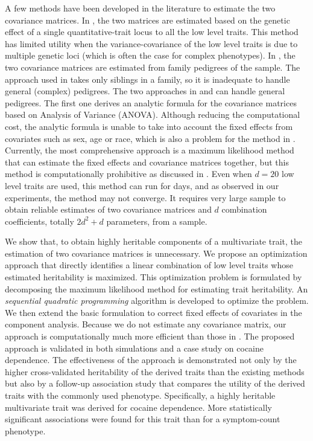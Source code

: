 \documentclass[10pt,letterpaper]{article}
\begin{document}
A few methods have been developed in the literature to estimate the two covariance matrices. In \cite{Wang:2007:pch-ridge,Klei:2008:pch}, the two matrices are estimated based on the genetic effect of a single quantitative-trait locus to all the low level traits. This method has limited utility when the variance-covariance of the low level traits is due to multiple genetic loci (which is often the case for complex phenotypes). In \cite{Ott:1999:pch,pch:Oualkacha:2012,mendal2013}, the two covariance matrices are estimated from family pedigrees of the sample. The approach used in \cite{Ott:1999:pch} takes only siblings in a family, so it is inadequate to handle general (complex) pedigrees.  The two approaches in \cite{pch:Oualkacha:2012} and \cite{mendal2013} can handle general pedigrees. The first one derives an analytic formula for the covariance matrices based on Analysis of Variance (ANOVA). Although reducing the computational cost, the analytic formula is unable to take into account the fixed effects from covariates such as sex, age or race, which is also a problem for the method in \cite{Ott:1999:pch}. Currently, the most comprehensive approach is a maximum likelihood method \cite{mendal2013} that can estimate the fixed effects and covariance matrices together, but this method is computationally prohibitive as discussed in \cite{pch:Oualkacha:2012}. Even when $d=20$ low level traits are used, this method can run for days, and as observed in our experiments, the method may not converge. It requires very large sample to obtain reliable estimates of two covariance matrices and $d$ combination coefficients, totally $2 d^2 + d$ parameters, from a sample.


We show that, to obtain highly heritable components of a multivariate trait, the estimation of two covariance matrices is unnecessary. We propose an optimization approach that directly identifies a linear combination of low level traits whose estimated heritability is maximized. This optimization problem is formulated by decomposing the maximum likelihood method for estimating trait heritability. An {\em sequential quadratic programming} algorithm is developed to optimize the problem. We then extend the basic formulation to correct fixed effects of covariates in the component analysis. Because we do not estimate any covariance matrix, our approach is computationally much more efficient than those in \cite{Ott:1999:pch,mendal2013}. The proposed approach is validated in both simulations and a case study on cocaine dependence. The effectiveness of the approach is demonstrated not only by the higher cross-validated heritability of the derived traits than the existing methods but also by a follow-up association study that compares the utility of the derived traits with the commonly used phenotype. Specifically, a highly heritable multivariate trait was derived for cocaine dependence. More statistically significant associations were found for this trait than for a symptom-count phenotype. 
\end{document}
